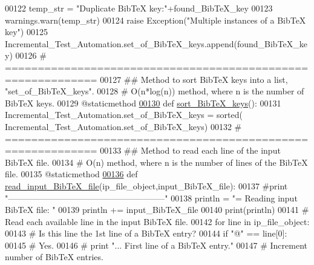 \begin{DoxyCode}
00122             temp\_str = \textcolor{stringliteral}{"Duplicate BibTeX key:"}+found\_BibTeX\_key
00123             warnings.warn(temp\_str)
00124             \textcolor{keywordflow}{raise} Exception(\textcolor{stringliteral}{"Multiple instances of a BibTeX key"})
00125         Incremental\_Test\_Automation.set\_of\_BibTeX\_keys.append(found\_BibTeX\_key)
00126     \textcolor{comment}{# ============================================================}
00127     \textcolor{comment}{##  Method to sort BibTeX keys into a list, "set\_of\_BibTeX\_keys".}
00128     \textcolor{comment}{#   O(n*log(n)) method, where n is the number of BibTeX keys.}
00129     @staticmethod
\hypertarget{incremental__test_8py_source_l00130}{}\hyperlink{classincremental__test_1_1Incremental__Test__Automation_a856c60714b5d716d5eb630cbc3d55d09}{00130}     \textcolor{keyword}{def }\hyperlink{classincremental__test_1_1Incremental__Test__Automation_a856c60714b5d716d5eb630cbc3d55d09}{sort\_BibTeX\_keys}():
00131         Incremental\_Test\_Automation.set\_of\_BibTeX\_keys = sorted(
      Incremental\_Test\_Automation.set\_of\_BibTeX\_keys)
00132     \textcolor{comment}{# ============================================================}
00133     \textcolor{comment}{##  Method to read each line of the input BibTeX file.}
00134     \textcolor{comment}{#   O(n) method, where n is the number of lines of the BibTeX file.}
00135     @staticmethod
\hypertarget{incremental__test_8py_source_l00136}{}\hyperlink{classincremental__test_1_1Incremental__Test__Automation_a7cec6a541c4680c857a699dbe363ffbd}{00136}     \textcolor{keyword}{def }\hyperlink{classincremental__test_1_1Incremental__Test__Automation_a7cec6a541c4680c857a699dbe363ffbd}{read\_input\_BibTeX\_file}(ip\_file\_object,input\_BibTeX\_file):
00137         \textcolor{comment}{#print "--------------------------------------------------------"}
00138         println = \textcolor{stringliteral}{"=    Reading input BibTeX file: "}
00139         println += input\_BibTeX\_file
00140         print(println)
00141         \textcolor{comment}{# Read each available line in the input BibTeX file.}
00142         \textcolor{keywordflow}{for} line \textcolor{keywordflow}{in} ip\_file\_object:
00143             \textcolor{comment}{# Is this line the 1st line of a BibTeX entry?}
00144             \textcolor{keywordflow}{if} \textcolor{stringliteral}{"@"} == line[0]:
00145                 \textcolor{comment}{# Yes.}
00146 \textcolor{comment}{#               print "...  First line of a BibTeX entry."}
00147                 \textcolor{comment}{# Increment number of BibTeX entries.}

\end{DoxyCode}
